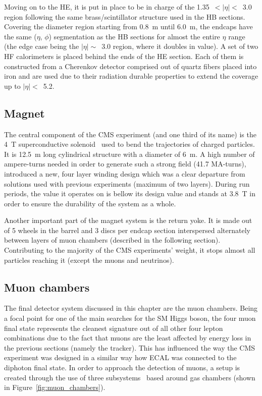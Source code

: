\hspace{10pt} Moving on to the HE, it is put in place to be in charge of the 1.35~$<|\eta|<$~3.0 region following the same brass/scintillator structure used in the HB sections. Covering the diameter region starting from 0.8~m until 6.0~m, the endcaps have the same ($\eta$, $\phi$) segmentation as the HB sections for almost the entire $\eta$ range (the edge case being the $|\eta|\sim$~3.0 region, where it doubles in value). A set of two HF calorimeters is placed behind the ends of the HE section. Each of them is constructed from a Cherenkov detector comprised out of quartz fibers placed into iron and are used due to their radiation durable properties to extend the coverage up to $|\eta|<$~5.2.


\subsection{Magnet}
\hspace{10pt} The central component of the CMS experiment (and one third of its name) is the 4~T superconductive solenoid~\cite{cms:paper} used to bend the trajectories of charged particles. It is 12.5~m long cylindrical structure with a diameter of 6~m. A high number of ampere-turns needed in order to generate such a strong field (41.7 MA-turns), introduced a new, four layer winding design which was a clear departure from solutions used with previous experiments (maximum of two layers). During run periods, the value it operates on is bellow its design value and stands at 3.8~T in order to ensure the durability of the system as a whole.

\hspace{10pt} Another important part of the magnet system is the return yoke. It is made out of 5 wheels in the barrel and 3 discs per endcap section interspersed alternately between layers of muon chambers (described in the following section). Contributing to the majority of the CMS experiments' weight, it stops almost all particles reaching it (except the muons and neutrinos).
\subsection{Muon chambers}
\label{subsec:cmsmuon}
\hspace{10pt} The final detector system discussed in this chapter are the muon chambers. Being a focal point for one of the main searches for the SM Higgs boson, the four muon final state represents the cleanest signature out of all other four lepton combinations due to the fact that muons are the least affected by energy loss in the previous sections (namely the tracker). This has influenced the way the CMS experiment was designed in a similar way how ECAL was connected to the diphoton final state. In order to approach the detection of muons, a setup is created through the use of three subsystems~\cite{cms:paper,muon_chambers_proceedings} based around gas chambers (shown in Figure~\ref{fig:muon_chambers}). 

